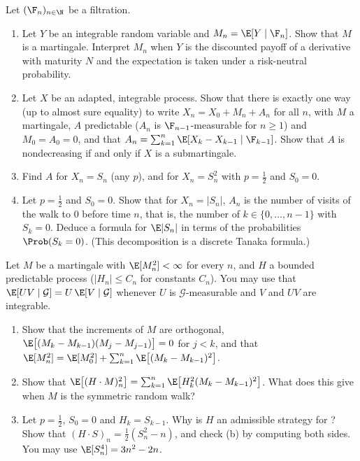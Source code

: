 
\begin{exercise}\label{ex:mg-doob}
\medium Let $(\F_n)_{n\in\N}$ be a filtration.
\begin{enumerate}[label=(\alph*)]
  \item Let $Y$ be an integrable random variable and $M_n=\E[Y\mid\F_n]$. Show that $M$ is a
    martingale. Interpret $M_n$ when $Y$ is the discounted payoff of a derivative with maturity
    $N$ and the expectation is taken under a risk-neutral probability.
  \item Let $X$ be an adapted, integrable process. Show that there is exactly one way (up to
    almost sure equality) to write $X_n=X_0+M_n+A_n$ for all $n$, with $M$ a martingale, $A$
    predictable ($A_n$ is $\F_{n-1}$-measurable for $n\ge1$) and $M_0=A_0=0$, and that
    $A_n=\sum_{k=1}^n\E[X_k-X_{k-1}\mid\F_{k-1}]$. Show that $A$ is nondecreasing if and only
    if $X$ is a submartingale.
  \item Find $A$ for $X_n=S_n$ (any $p$), and for $X_n=S_n^2$ with $p=\frac12$ and $S_0=0$.
  \item Let $p=\frac12$ and $S_0=0$. Show that for $X_n=|S_n|$, $A_n$ is the number of visits
    of the walk to $0$ before time $n$, that is, the number of $k\in\{0,\dots,n-1\}$ with
    $S_k=0$. Deduce a formula for $\E|S_n|$ in terms of the probabilities $\Prob(S_k=0)$. (This
    decomposition is a discrete Tanaka formula.)
\end{enumerate}
\end{exercise}

\begin{exercise}\label{ex:mg-isometry}
\easy Let $M$ be a martingale with $\E[M_n^2]<\infty$ for every $n$, and $H$ a bounded
predictable process ($|H_n|\le C_n$ for constants $C_n$). You may use that
$\E[UV\mid\mathcal G]=U\,\E[V\mid\mathcal G]$ whenever $U$ is $\mathcal G$-measurable and $V$
and $UV$ are integrable.
\begin{enumerate}[label=(\alph*)]
  \item Show that the increments of $M$ are orthogonal,
    $\E\big[(M_k-M_{k-1})(M_j-M_{j-1})\big]=0$ for $j<k$, and that
    $\E[M_n^2]=\E[M_0^2]+\sum_{k=1}^n\E\big[(M_k-M_{k-1})^2\big]$.
  \item Show that $\E\big[(H\cdot M)_n^2\big]=\sum_{k=1}^n\E\big[H_k^2(M_k-M_{k-1})^2\big]$. What
    does this give when $M$ is the symmetric random walk?
  \item Let $p=\frac12$, $S_0=0$ and $H_k=S_{k-1}$. Why is $H$ an admissible strategy for
    ? Show that $(H\cdot S)_n=\frac12(S_n^2-n)$, and check (b) by
    computing both sides. You may use $\E[S_n^4]=3n^2-2n$.
\end{enumerate}
\end{exercise}

